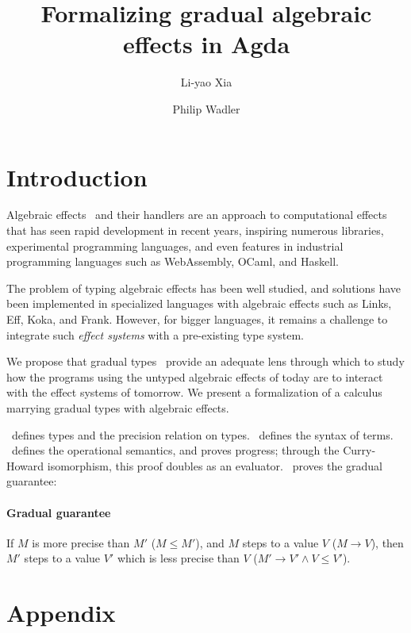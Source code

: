 \documentclass[\ClassReview acmsmall,sigplan,screen,prologue,dvipsnames,style=authoryear,anonymous]{acmart}
\author[L. Xia]{Li-yao Xia}
\affiliation{
  \institution{University of Edinburgh}
  \city{Edinburgh}\country{United Kingdom}
}
\author[P. Wadler]{Philip Wadler}
\affiliation{
  \institution{University of Edinburgh}
  \city{Edinburgh}\country{United Kingdom}
}
\title{Formalizing gradual algebraic effects in Agda}
\begin{document}
\maketitle

\section{Introduction}

Algebraic effects~\citep{plotkin2001semantics} and their handlers are an
approach to computational effects that has seen rapid development in recent
years, inspiring numerous libraries, experimental programming languages,
and even features in industrial programming languages such as WebAssembly, OCaml,
and Haskell.

The problem of typing algebraic effects has been well studied, and solutions
have been implemented in specialized languages with algebraic effects such as
Links, Eff, Koka, and Frank. However, for bigger languages, it remains a
challenge to integrate such \emph{effect systems} with a pre-existing type
system.

We propose that gradual types~\citep{siek2015} provide an adequate lens through
which to study how the programs using the untyped algebraic effects of today are to
interact with the effect systems of tomorrow. We present a formalization of a
calculus marrying gradual types with algebraic effects.

~defines types and the precision relation on types.
~defines the syntax of terms.
~defines the operational semantics, and proves progress;
through the Curry-Howard isomorphism, this proof doubles as an evaluator.
~proves the gradual guarantee:

\paragraph{Gradual guarantee} If $M$ is more precise than $M'$ ($M \le M'$),
and $M$ steps to a value $V$ ($M \to V$), then $M'$ steps to a value $V'$ which
is less precise than $V$ ($M' \to V' \wedge V \le V'$).









\appendix
\section{Appendix}
\label{sec:appendix}




\end{document}
